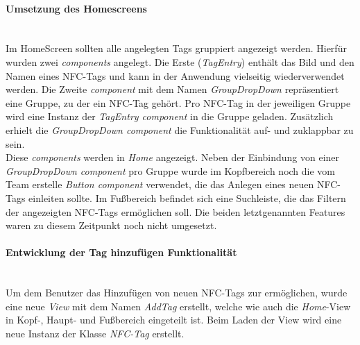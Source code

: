 \documentclass[10pt, a4paper]{article}
\begin{document}
\begin{onehalfspace}
\paragraph*{Umsetzung des Homescreens}$~$ \\
Im HomeScreen sollten alle angelegten Tags gruppiert angezeigt werden. Hierfür wurden zwei \textit{components} angelegt. Die Erste (\textit{TagEntry})
enthält das Bild und den Namen eines NFC-Tags und kann in der Anwendung vielseitig wiederverwendet werden. Die Zweite \textit{component} mit dem Namen
\textit{GroupDropDown} repräsentiert eine Gruppe, zu der ein NFC-Tag gehört.
Pro NFC-Tag in der jeweiligen Gruppe wird eine Instanz der \textit{TagEntry component} in die Gruppe geladen.
Zusätzlich erhielt die \textit{GroupDropDown component} die Funktionalität auf- und
zuklappbar zu sein. \\
Diese \textit{components} werden in \textit{Home} angezeigt. Neben der Einbindung von einer \textit{GroupDropDown component} pro Gruppe
wurde im Kopfbereich noch die vom Team erstelle \textit{Button component} verwendet, die das Anlegen eines neuen NFC-Tags einleiten sollte.
Im Fußbereich befindet sich eine Suchleiste, die das Filtern der angezeigten NFC-Tags ermöglichen soll.
Die beiden letztgenannten Features waren zu diesem Zeitpunkt noch nicht umgesetzt.

\paragraph*{Entwicklung der \glqq Tag hinzufügen\grqq{} Funktionalität}$~$ \\
Um dem Benutzer das Hinzufügen von neuen NFC-Tags zur ermöglichen, wurde eine neue \textit{View} mit dem Namen \textit{AddTag} erstellt, welche wie auch
die \textit{Home}-View in Kopf-, Haupt- und Fußbereich eingeteilt ist. Beim Laden der View wird eine neue Instanz der Klasse \textit{NFC-Tag} erstellt.
\\~\\


\end{onehalfspace}
\end{document}
